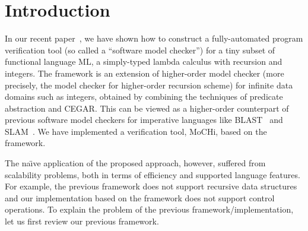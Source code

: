 \vspace{-5pt}
\section{Introduction}
\label{sec:intro}

In our recent paper~\cite{KobayashiPLDI2011}, we have shown how to
construct a fully-automated program verification tool (so called a
``software model checker'') for a tiny subset of functional language ML, a
simply-typed lambda calculus with recursion and integers.
The framework is an extension of higher-order model checker
(more precisely, the model checker for higher-order recursion scheme)
for infinite data domains such as integers, obtained by 
combining the techniques of
predicate abstraction and CEGAR.  This can be viewed as a higher-order
counterpart of previous software model checkers for imperative languages
like BLAST~\cite{Henzinger2002} and SLAM~\cite{Ball2002}.
We have implemented a verification tool, MoCHi, based on the framework.

The na\"{\i}ve application of the proposed approach, however, suffered
from scalability problems, both in terms of efficiency and supported
language features. For example, the previous framework does not support
recursive data structures and our implementation based on the framework
does not support control operations.  To explain the problem of the
previous framework/implementation, let us first review our previous
framework.

